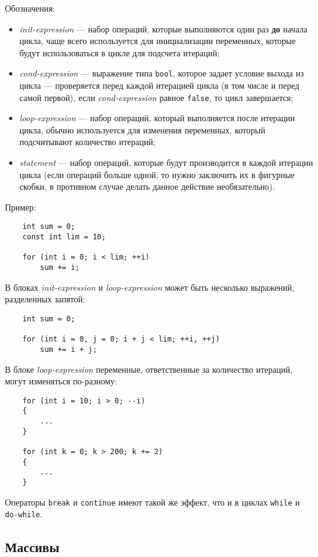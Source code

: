 Обозначения:
\begin{itemize}
    \item \textit{init-expression} --- набор операций, которые выполняются один раз \textbf{до} начала цикла, чаще всего используется для инициализации переменных, которые будут использоваться в цикле для подсчета итераций;
    \item \textit{cond-expression} --- выражение типа \lstinline|bool|, которое задает условие выхода из цикла --- проверяется перед каждой итерацией цикла (в том числе и перед самой первой), если \textit{cond-expression} равное \lstinline|false|, то цикл завершается;
    \item \textit{loop-expression} --- набор операций, который выполняется после итерации цикла, обычно используется для изменения переменных, который подсчитывают количество итераций;
    \item \textit{statement} --- набор операций, которые будут производится в каждой итерации цикла (если операций больше одной, то нужно заключить их в фигурные скобки, в противном случае делать данное действие необязательно).
\end{itemize}

Пример:

\begin{lstlisting}
    int sum = 0;
    const int lim = 10;

    for (int i = 0; i < lim; ++i)
        sum += i;
\end{lstlisting}

В блоках \textit{init-expression} и \textit{loop-expression} может быть несколько выражений, разделенных запятой:
\begin{lstlisting}
    int sum = 0;

    for (int i = 0, j = 0; i + j < lim; ++i, ++j)
        sum += i + j;
\end{lstlisting}

В блоке \textit{loop-expression} переменные, ответственные за количество
итераций, могут изменяться по-разному:
\begin{lstlisting}
    for (int i = 10; i > 0; --i)
    {
        ...
    }

    for (int k = 0; k > 200; k += 2)
    {
        ...
    }
\end{lstlisting}

Операторы \lstinline|break| и \lstinline|continue| имеют такой же эффект, что и в циклах \lstinline|while| и \lstinline|do-while|.

\subsection{Массивы}
\label{subsec:Arrays}
